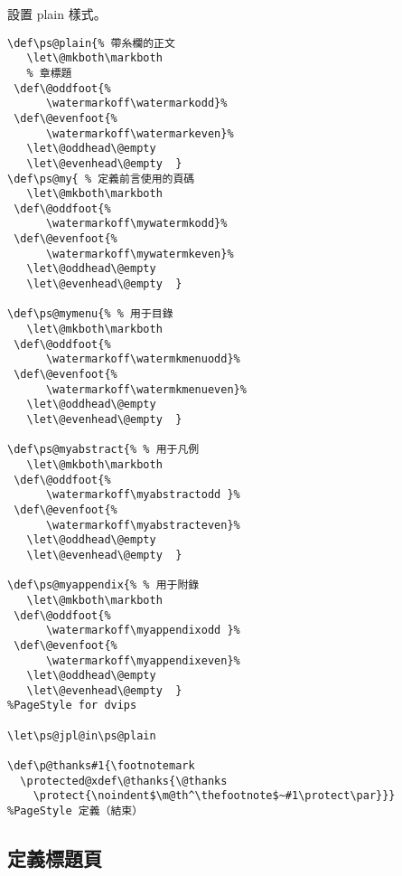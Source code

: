 \par%
設置 plain 樣式。
\begin{lstlisting}[firstnumber=812]
%PageStyle 定義（開始）
\def\ps@plain{% 帶糸欄的正文
   \let\@mkboth\markboth
   % 章標題
 \def\@oddfoot{%
      \watermarkoff\watermarkodd}%
 \def\@evenfoot{%
      \watermarkoff\watermarkeven}%
   \let\@oddhead\@empty
   \let\@evenhead\@empty  }
\def\ps@my{ % 定義前言使用的頁碼
   \let\@mkboth\markboth
 \def\@oddfoot{%
      \watermarkoff\mywatermkodd}%
 \def\@evenfoot{%
      \watermarkoff\mywatermkeven}%
   \let\@oddhead\@empty
   \let\@evenhead\@empty  }

\def\ps@mymenu{% % 用于目錄
   \let\@mkboth\markboth
 \def\@oddfoot{%
      \watermarkoff\watermkmenuodd}%
 \def\@evenfoot{%
      \watermarkoff\watermkmenueven}%
   \let\@oddhead\@empty
   \let\@evenhead\@empty  }

\def\ps@myabstract{% % 用于凡例
   \let\@mkboth\markboth
 \def\@oddfoot{%
      \watermarkoff\myabstractodd }%
 \def\@evenfoot{%
      \watermarkoff\myabstracteven}%
   \let\@oddhead\@empty
   \let\@evenhead\@empty  }

\def\ps@myappendix{% % 用于附錄
   \let\@mkboth\markboth
 \def\@oddfoot{%
      \watermarkoff\myappendixodd }%
 \def\@evenfoot{%
      \watermarkoff\myappendixeven}%
   \let\@oddhead\@empty
   \let\@evenhead\@empty  }
%PageStyle for dvips

\let\ps@jpl@in\ps@plain

\def\p@thanks#1{\footnotemark
  \protected@xdef\@thanks{\@thanks
    \protect{\noindent$\m@th^\thefootnote$~#1\protect\par}}}
%PageStyle 定義（結束）
\end{lstlisting}

\subsection{定義標題頁}

